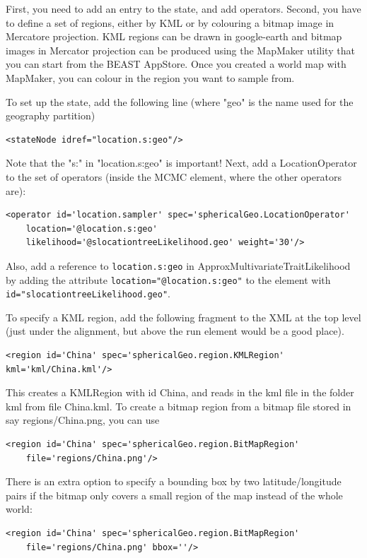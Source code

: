 \documentclass{article}
\begin{document}
First, you need to add an entry to the state, and add operators.
Second, you have to define a set of regions, either by KML or by colouring a bitmap image in Mercatore projection. KML regions can be drawn in google-earth and bitmap images in Mercator projection can be produced using the MapMaker utility that you can start from the BEAST AppStore. Once you created a world map with MapMaker, you can colour in the region you want to sample from.

To set up the state, add the following line (where "geo" is the name used for the geography partition)

\begin{verbatim}
<stateNode idref="location.s:geo"/>
\end{verbatim}

Note that the "s:" in "location.s:geo" is important!
Next, add a LocationOperator to the set of operators (inside the MCMC element, where the other operators are):

\begin{verbatim}
<operator id='location.sampler' spec='sphericalGeo.LocationOperator' 
    location='@location.s:geo' 
    likelihood='@slocationtreeLikelihood.geo' weight='30'/>
\end{verbatim}

Also, add a reference to {\tt location.s:geo} in ApproxMultivariateTraitLikelihood by adding the attribute {\tt location="@location.s:geo"} to the element with {\tt id="slocationtreeLikelihood.geo"}.

To specify a KML region, add the following fragment to the XML at the top level (just under the alignment, but above the run element would be a good place).

\begin{verbatim}
<region id='China' spec='sphericalGeo.region.KMLRegion' kml='kml/China.kml'/>
\end{verbatim}

This creates a KMLRegion with id China, and reads in the kml file in the folder kml from file China.kml. To create a bitmap region from a bitmap file stored in say regions/China.png, you can use

\begin{verbatim}
<region id='China' spec='sphericalGeo.region.BitMapRegion'
	file='regions/China.png'/>
\end{verbatim}
There is an extra option to specify a bounding box by two latitude/longitude pairs if the bitmap only covers a small region of the map instead of the whole world:
\begin{verbatim}
<region id='China' spec='sphericalGeo.region.BitMapRegion'
	file='regions/China.png' bbox=''/>
\end{verbatim}
\end{document}
